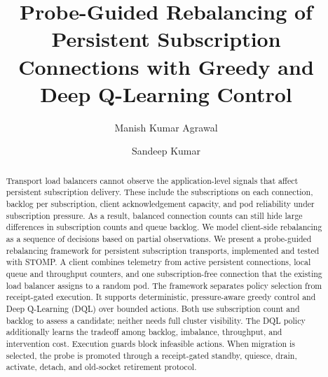 \documentclass[manuscript]{acmart}
\begin{document}
\title[Probe-Guided Rebalancing of Persistent Subscription Connections]{Probe-Guided Rebalancing of Persistent Subscription Connections with Greedy and Deep Q-Learning Control}

\author{Manish Kumar Agrawal}

\author{Sandeep Kumar}

\begin{abstract}
Transport load balancers cannot observe the application-level signals that
affect persistent subscription delivery. These include the subscriptions on
each connection, backlog per subscription, client acknowledgement capacity,
and pod reliability under subscription pressure. As a result, balanced
connection counts can still hide large differences in subscription counts and
queue backlog. We model client-side rebalancing as a sequence of decisions
based on partial observations. We present a probe-guided rebalancing framework
for persistent subscription transports, implemented and tested with STOMP. A
client combines telemetry from active persistent connections, local queue and
throughput counters, and one subscription-free connection that the existing
load balancer assigns to a random pod. The framework separates policy selection
from receipt-gated execution. It supports deterministic, pressure-aware greedy
control and Deep Q-Learning (DQL) over bounded actions. Both use subscription
count and backlog to assess a candidate; neither needs full cluster visibility.
The DQL policy additionally learns the tradeoff among backlog, imbalance,
throughput, and intervention cost. Execution guards block infeasible actions.
When migration is selected, the probe is promoted through a receipt-gated
standby, quiesce, drain, activate, detach, and old-socket retirement protocol.


\end{abstract}
\end{document}
